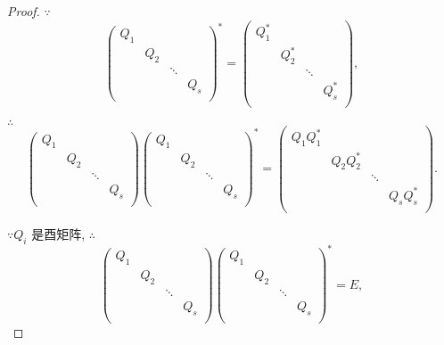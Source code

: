 \documentclass[color=black,device=normal,lang=cn,mode=geye]{elegantnote}
\begin{document}
\begin{proof}
    $\because$
    \[\begin{pmatrix}
        Q_1 \\
        & Q_2 \\
        && \ddots \\
        &&& Q_s \\
    \end{pmatrix}^*=\begin{pmatrix}
        Q_1^* \\
        & Q_2^* \\
        && \ddots \\
        &&& Q_s^* \\
    \end{pmatrix},\]

    $\therefore$
    \[\begin{pmatrix}
        Q_1 \\
        & Q_2 \\
        && \ddots \\
        &&& Q_s \\
    \end{pmatrix}\begin{pmatrix}
        Q_1 \\
        & Q_2 \\
        && \ddots \\
        &&& Q_s \\
    \end{pmatrix}^*=\begin{pmatrix}
        Q_1Q_1^* \\
        & Q_2Q_2^* \\
        && \ddots \\
        &&& Q_sQ_s^* \\
    \end{pmatrix}.\]

    $\because Q_i$ 是酉矩阵, $\therefore$
    \[\begin{pmatrix}
        Q_1 \\
        & Q_2 \\
        && \ddots \\
        &&& Q_s \\
    \end{pmatrix}\begin{pmatrix}
        Q_1 \\
        & Q_2 \\
        && \ddots \\
        &&& Q_s \\
    \end{pmatrix}^*=E,\]


\end{proof}
\end{document}

